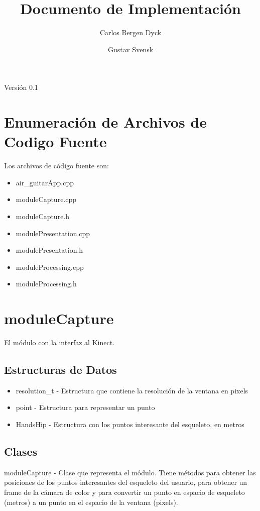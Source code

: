 \documentclass[a4paper,10pt]{article}
\title{Documento de Implementación}
\author{Carlos Bergen Dyck \and Gustav Svensk}
\begin{document}
\renewcommand{\arraystretch}{1.5}
\maketitle
\begin{center}
        {\large Versión 0.1}
\end{center}
\newpage
\section{Enumeración de Archivos de Codigo Fuente}
Los archivos de código fuente son:
\begin{itemize}
\item{air\_guitarApp.cpp}
\item{moduleCapture.cpp}
\item{moduleCapture.h}
\item{modulePresentation.cpp}
\item{modulePresentation.h}
\item{moduleProcessing.cpp}
\item{moduleProcessing.h}
\end{itemize}

\section{moduleCapture}
\label{sec:captura}
El módulo con la interfaz al Kinect.
\subsection{Estructuras de Datos}
\begin{itemize}
\item{resolution\_t - Estructura que contiene la resolución de la ventana en pixels}
\item{point - Estructura para representar un punto}
\item{HandsHip - Estructura con los puntos interesante del esqueleto, en metros}
\end{itemize}
\subsection{Clases}
moduleCapture - Clase que representa el módulo.
Tiene métodos para obtener las posiciones de los puntos interesantes del
esqueleto del usuario, para obtener un frame de la cámara de color y para
convertir un punto en espacio de esqueleto (metros) a un punto en el espacio de
la ventana (pixels).
\end{document}
